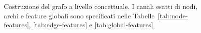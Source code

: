 \begin{figure}[H]
\centering
{}
\caption{Costruzione del grafo a livello concettuale.  I canali esatti di nodi, archi e feature globali sono specificati nelle Tabelle~\ref{tab:node-features}, \ref{tab:edge-features} e \ref{tab:global-features}.}
\label{fig:graph-pipeline}
\end{figure}
